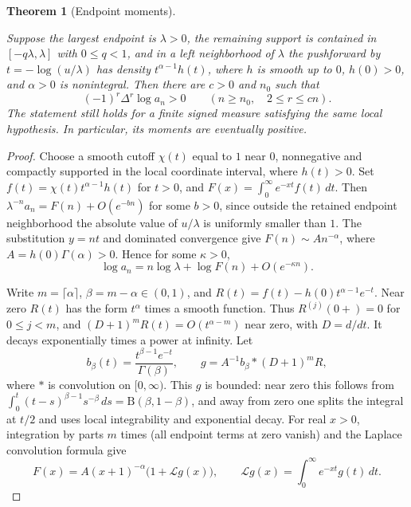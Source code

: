 \documentclass[11pt,a4paper]{article}
\newtheorem{theorem}{Theorem}[section]
\begin{document}
\begin{theorem}[Endpoint moments]\label{thm:endpoint}

Suppose the largest endpoint is $\lambda>0$, the remaining support is contained in $[-q\lambda,\lambda]$ with $0\le q<1$, and in a left neighborhood of $\lambda$ the pushforward by $t=-\log(u/\lambda)$ has density $t^{\alpha-1}h(t)$, where $h$ is smooth up to $0$, $h(0)>0$, and $\alpha>0$ is nonintegral. Then there are $c>0$ and $n_0$ such that
\[
 (-1)^r\Delta^r\log a_n>0\qquad(n\ge n_0,\quad 2\le r\le cn).
\]
The statement still holds for a finite signed measure satisfying the same local hypothesis. In particular, its moments are eventually positive.\end{theorem}

\begin{proof}
Choose a smooth cutoff $\chi(t)$ equal to $1$ near $0$, nonnegative and compactly supported in the local coordinate interval, where $h(t)>0$. Set $f(t)=\chi(t)t^{\alpha-1}h(t)$ for $t>0$, and
$F(x)=\int_0^\infty e^{-xt}f(t)\,dt$. Then
$\lambda^{-n}a_n=F(n)+O(e^{-bn})$ for some $b>0$, since outside the retained endpoint neighborhood the absolute value of $u/\lambda$ is uniformly smaller than $1$. The substitution $y=nt$ and dominated convergence give $F(n)\sim A n^{-\alpha}$, where $A=h(0)\Gamma(\alpha)>0$. Hence for some $\kappa>0$,
\[
 \log a_n=n\log\lambda+\log F(n)+O(e^{-\kappa n}).
\]

Write $m=\lceil\alpha\rceil$, $\beta=m-\alpha\in(0,1)$, and
$R(t)=f(t)-h(0)t^{\alpha-1}e^{-t}$. Near zero $R(t)$ has the form $t^\alpha$ times a smooth function. Thus $R^{(j)}(0+)=0$ for $0\le j<m$, and $(D+1)^m R(t)=O(t^{\alpha-m})$ near zero, with $D=d/dt$. It decays exponentially times a power at infinity. Let
\[
 b_\beta(t)=\frac{t^{\beta-1}e^{-t}}{\Gamma(\beta)},\qquad
 g=A^{-1}b_\beta * (D+1)^mR,
\]
where $*$ is convolution on $[0,\infty)$. This $g$ is bounded: near zero this follows from $\int_0^t(t-s)^{\beta-1}s^{-\beta}\,ds=\mathrm B(\beta,1-\beta)$, and away from zero one splits the integral at $t/2$ and uses local integrability and exponential decay. For real $x>0$, integration by parts $m$ times (all endpoint terms at zero vanish) and the Laplace convolution formula give
\[
 F(x)=A(x+1)^{-\alpha}\bigl(1+\mathcal L g(x)\bigr),
 \qquad \mathcal Lg(x)=\int_0^\infty e^{-xt}g(t)\,dt .
\]


\end{proof}
\end{document}

